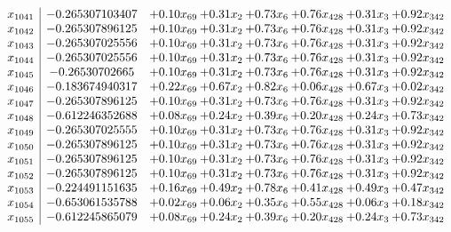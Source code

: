 \documentclass[8pt]{article}
\begin{document}
\[\begin{array}{c| c c@{\hskip 2pt} c@{\hskip 2pt} c@{\hskip 2pt} c@{\hskip 2pt} c@{\hskip 2pt} c@{\hskip 2pt} }
 x_{1041}   &  -0.265307103407 & +  0.10 x_{69} & +  0.31 x_{2} & +  0.73 x_{6} & +  0.76 x_{428} & +  0.31 x_{3} & +  0.92 x_{342}\\
 x_{1042}   &  -0.265307896125 & +  0.10 x_{69} & +  0.31 x_{2} & +  0.73 x_{6} & +  0.76 x_{428} & +  0.31 x_{3} & +  0.92 x_{342}\\
 x_{1043}   &  -0.265307025556 & +  0.10 x_{69} & +  0.31 x_{2} & +  0.73 x_{6} & +  0.76 x_{428} & +  0.31 x_{3} & +  0.92 x_{342}\\
 x_{1044}   &  -0.265307025556 & +  0.10 x_{69} & +  0.31 x_{2} & +  0.73 x_{6} & +  0.76 x_{428} & +  0.31 x_{3} & +  0.92 x_{342}\\
 x_{1045}   &  -0.26530702665 & +  0.10 x_{69} & +  0.31 x_{2} & +  0.73 x_{6} & +  0.76 x_{428} & +  0.31 x_{3} & +  0.92 x_{342}\\
 x_{1046}   &  -0.183674940317 & +  0.22 x_{69} & +  0.67 x_{2} & +  0.82 x_{6} & +  0.06 x_{428} & +  0.67 x_{3} & +  0.02 x_{342}\\
 x_{1047}   &  -0.265307896125 & +  0.10 x_{69} & +  0.31 x_{2} & +  0.73 x_{6} & +  0.76 x_{428} & +  0.31 x_{3} & +  0.92 x_{342}\\
 x_{1048}   &  -0.612246352688 & +  0.08 x_{69} & +  0.24 x_{2} & +  0.39 x_{6} & +  0.20 x_{428} & +  0.24 x_{3} & +  0.73 x_{342}\\
 x_{1049}   &  -0.265307025555 & +  0.10 x_{69} & +  0.31 x_{2} & +  0.73 x_{6} & +  0.76 x_{428} & +  0.31 x_{3} & +  0.92 x_{342}\\
 x_{1050}   &  -0.265307896125 & +  0.10 x_{69} & +  0.31 x_{2} & +  0.73 x_{6} & +  0.76 x_{428} & +  0.31 x_{3} & +  0.92 x_{342}\\
 x_{1051}   &  -0.265307896125 & +  0.10 x_{69} & +  0.31 x_{2} & +  0.73 x_{6} & +  0.76 x_{428} & +  0.31 x_{3} & +  0.92 x_{342}\\
 x_{1052}   &  -0.265307896125 & +  0.10 x_{69} & +  0.31 x_{2} & +  0.73 x_{6} & +  0.76 x_{428} & +  0.31 x_{3} & +  0.92 x_{342}\\
 x_{1053}   &  -0.224491151635 & +  0.16 x_{69} & +  0.49 x_{2} & +  0.78 x_{6} & +  0.41 x_{428} & +  0.49 x_{3} & +  0.47 x_{342}\\
 x_{1054}   &  -0.653061535788 & +  0.02 x_{69} & +  0.06 x_{2} & +  0.35 x_{6} & +  0.55 x_{428} & +  0.06 x_{3} & +  0.18 x_{342}\\
 x_{1055}   &  -0.612245865079 & +  0.08 x_{69} & +  0.24 x_{2} & +  0.39 x_{6} & +  0.20 x_{428} & +  0.24 x_{3} & +  0.73 x_{342}\\

\end{array}\]
\end{document}

